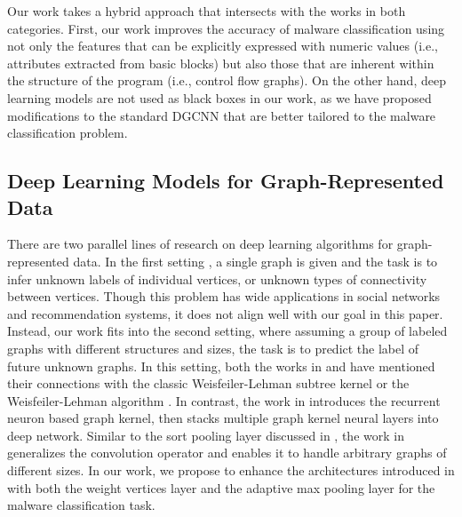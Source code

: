 Our work takes a hybrid approach that intersects with the works in both categories. First, our work improves the accuracy of malware classification using not only the features that can be explicitly expressed with numeric values (i.e., attributes extracted from basic blocks) but also those that are inherent within the structure of the program (i.e., control flow graphs). On the other hand, deep learning models are not used as black boxes in our work, as we have proposed modifications to the standard DGCNN that are better tailored to the malware classification problem.

\subsection{Deep Learning Models for Graph-Represented Data}

There are two parallel lines of research on deep learning algorithms for graph-represented data.
In the first setting \cite{Node2Vec, LineNetworkEmbedding, SemiSupervisedGcn}, a single graph is given and the task is to infer unknown labels of individual vertices, or  unknown types of connectivity between vertices.
Though this problem has wide applications in social networks and recommendation systems, it does not align well with our goal in this paper. 
Instead, our work fits into the second setting, where assuming a group of labeled graphs with different structures and sizes, the task is to predict the label of future unknown graphs\cite{Dgcnn, SeqGraphKernels, SimonovskyEcc}.
In this setting, both the works in\cite{SeqGraphKernels} and \cite{Dgcnn} have mentioned their connections with the classic Weisfeiler-Lehman subtree kernel \cite{WlGraphKernel} or the Weisfeiler-Lehman algorithm \cite{WlAlgorithm}.
In contrast, the work in \cite{SeqGraphKernels} introduces the recurrent neuron based graph kernel, then stacks multiple graph kernel neural layers into deep network.
Similar to the sort pooling layer discussed in \cite{Dgcnn}, the work in \cite{SimonovskyEcc} generalizes the convolution operator and enables it to handle arbitrary graphs of different sizes.
In our work, we propose to enhance the architectures introduced in \cite{Dgcnn} with both the weight vertices layer and the adaptive max pooling layer for the malware classification task.
